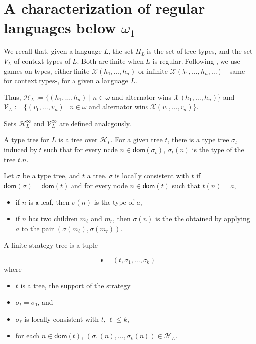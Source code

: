 \documentclass{llncs}
\newcommand {\dom}{\mathsf{dom}}
\begin{document}

\section{A characterization of regular languages  below $\omega_1$}

We recall that, given a language $L$, the set $H_L$ is the set of tree types, and the set $V_L$ of context types of $L$. Both are finite when $L$ is regular. Following \cite{bp}, we use  games on types, either finite $\mathcal{X}(h_1, \dots, h_n)$ or infinite $\mathcal{X}(h_1, \dots, h_n, \dots)$ - same for context types-, for a given a language $L$.



Thus, 
$\mathcal{H}_L:= \{(h_1, \dots, h_n) 
\mid 
n \in \omega 
$
and alternator wins $\mathcal{X}(h_1, \dots, h_n)\}$
and 
$\mathcal{V}_L:= \{(v_1, \dots, v_n) \mid n \in \omega 
$
and alternator wins $\mathcal{X}(v_1, \dots, v_n)\}$.

Sets 
$\mathcal{H}^\infty_L$ and $\mathcal{V}^\infty_L$ are defined analogously.




A type tree for $L$ is a tree over $\mathcal{H}_L$. For a given tree $t$, there is a type tree $\sigma_t$ induced by $t$ such that for every node $n \in \dom(\sigma_t)$, $\sigma_t(n)$ is the type of the tree $t.n$.

Let $\sigma$ be a type tree, and $t$ a tree. $\sigma$ is locally consistent with $t$ if $\dom(\sigma)=\dom(t)$ and for every node $n \in \dom(t)$ such that $t(n)=a$, 
\begin{itemize}
\item if $n$ is a leaf, then $\sigma(n)$ is the type of $a$,
\item if $n$ has two children $m_\ell$ and $m_r$, then $\sigma(n)$ is the the obtained by applying $a$ to the pair $(\sigma(m_\ell), \sigma(m_r))$.
\end{itemize}

A finite strategy tree is a tuple

\[ \mathfrak{s}=(t, \sigma_1, \dots, \sigma_k) \] where
\begin{itemize}
\item $t$ is a tree, the support of the strategy
\item $\sigma_t=\sigma_1$, and
\item $\sigma_\ell$ is locally consistent with $t$, $\ell \leq k$,
\item for each $n \in \dom(t)$, $(\sigma_1(n), \dots, \sigma_k(n)) \in \mathcal{H}_L$.
\end{itemize}
\end{document}
